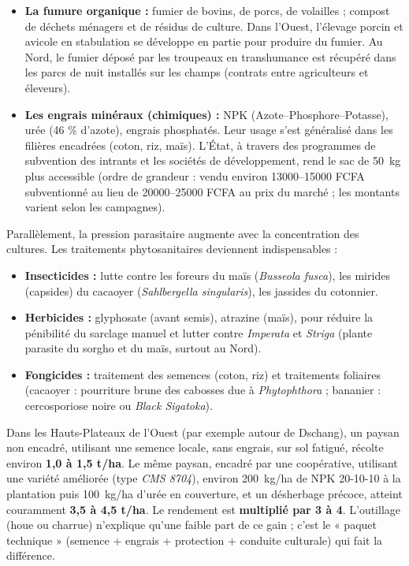 \documentclass[11pt]{article}
\newcommand{\cle}[1]{{\popxbold\color{popdark}#1}}
\begin{document}
\begin{itemize}
    \item \textbf{La fumure organique :} fumier de bovins, de porcs, de volailles ; compost de déchets ménagers et de résidus de culture. Dans l'Ouest, l'élevage porcin et avicole en stabulation se développe en partie pour produire du fumier. Au Nord, le fumier déposé par les troupeaux en transhumance est récupéré dans les parcs de nuit installés sur les champs (contrats entre agriculteurs et éleveurs).
    \item \textbf{Les engrais minéraux (chimiques) :} NPK (Azote--Phosphore--Potasse), urée (46 \% d'azote), engrais phosphatés. Leur usage s'est généralisé dans les filières encadrées (coton, riz, maïs). L'État, à travers des programmes de subvention des intrants et les sociétés de développement, rend le sac de \SI{50}{kg} plus accessible (ordre de grandeur : vendu environ \num{13 000}--\num{15 000} FCFA subventionné au lieu de \num{20 000}--\num{25 000} FCFA au prix du marché ; les montants varient selon les campagnes).
\end{itemize}

\noindent Parallèlement, la pression parasitaire augmente avec la concentration des cultures. Les \cle{traitements phytosanitaires} deviennent indispensables :
\begin{itemize}
    \item \textbf{Insecticides :} lutte contre les foreurs du maïs (\emph{Busseola fusca}), les mirides (capsides) du cacaoyer (\emph{Sahlbergella singularis}), les jassides du cotonnier.
    \item \textbf{Herbicides :} glyphosate (avant semis), atrazine (maïs), pour réduire la pénibilité du sarclage manuel et lutter contre \emph{Imperata} et \emph{Striga} (plante parasite du sorgho et du maïs, surtout au Nord).
    \item \textbf{Fongicides :} traitement des semences (coton, riz) et traitements foliaires (cacaoyer : pourriture brune des cabosses due à \emph{Phytophthora} ; bananier : cercosporiose noire ou \emph{Black Sigatoka}).
\end{itemize}

\begin{exemplebox}
Dans les Hauts-Plateaux de l'Ouest (par exemple autour de Dschang), un paysan non encadré, utilisant une semence locale, sans engrais, sur sol fatigué, récolte environ \textbf{1,0 à 1,5 t/ha}. Le même paysan, encadré par une coopérative, utilisant une variété améliorée (type \emph{CMS 8704}), environ \SI{200}{kg/ha} de NPK 20-10-10 à la plantation puis \SI{100}{kg/ha} d'urée en couverture, et un désherbage précoce, atteint couramment \textbf{3,5 à 4,5 t/ha}. Le rendement est \textbf{multiplié par 3 à 4}. L'outillage (houe ou charrue) n'explique qu'une faible part de ce gain ; c'est le « paquet technique » (semence + engrais + protection + conduite culturale) qui fait la différence.
\end{exemplebox}
\end{document}
